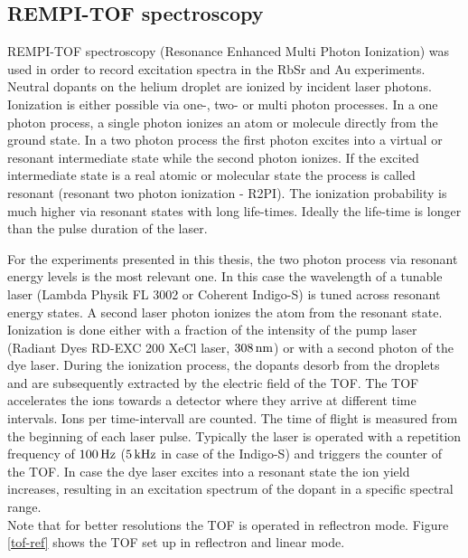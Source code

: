 \documentclass[parskip,12pt,headsepline,a4paper] {scrbook}
\begin{document}
\subsection{REMPI-TOF spectroscopy}
\vspace{-1\baselineskip}
REMPI-TOF spectroscopy (Resonance Enhanced Multi Photon Ionization) was used in order to record excitation spectra in the RbSr and Au experiments. Neutral dopants on the helium droplet are ionized by incident laser photons. Ionization is either possible via one-, two- or multi photon processes. In a one photon process, a single photon ionizes an atom or molecule directly from the ground state. In a two photon process the first photon excites into a virtual or resonant intermediate state while the second photon ionizes. If the excited intermediate state is a real atomic or molecular state the process is called resonant (resonant two photon ionization - R2PI). The ionization probability is much higher via resonant states with long life-times. Ideally the life-time is longer than the pulse duration of the laser. %

For the experiments presented in this thesis, the two photon process via resonant energy levels is the most relevant one. In this case the wavelength of a tunable laser (Lambda Physik FL 3002 or Coherent Indigo-S) is tuned across resonant energy states. A second laser photon ionizes the atom from the resonant state. Ionization is done either with a fraction of the intensity of the pump laser (Radiant Dyes RD-EXC 200 XeCl laser, $\unit[308]{nm}$) or with a second photon of the dye laser. During the ionization process, the dopants desorb from the droplets and are subsequently extracted by the electric field of the TOF. The TOF accelerates the ions towards a detector where they arrive at different time intervals. Ions per time-intervall are counted. The time of flight is measured from the beginning of each laser pulse. Typically the laser is operated with a repetition frequency of $\unit[100]{Hz}$ ($\unit[5]{kHz}$ in case of the Indigo-S) and triggers the counter of the TOF. In case the dye laser excites into a resonant state the ion yield increases, resulting in an excitation spectrum of the dopant in a specific spectral range. \\
Note that for better resolutions the TOF is operated in reflectron mode. Figure \ref{tof-ref} shows the TOF set up in reflectron and linear mode. \\
\end{document}
